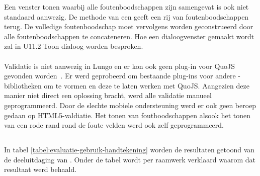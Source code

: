 Een venster tonen waarbij alle foutenboodschappen zijn samengevat is ook niet standaard aanwezig.
De  methode van een  geeft een rij van foutenboodschappen terug.
De volledige foutenboodschap moet vervolgens worden geconstrueerd door alle foutenboodschappen te concateneren.
Hoe een dialoogvenster gemaakt wordt zal in U11.2 Toon dialoog worden besproken.

\paragraph{\lungo}
Validatie is niet aanwezig in Lungo en er kon ook geen plug-in voor QuoJS gevonden worden~\cite{Ameye2013}.
Er werd geprobeerd om bestaande plug-ins voor andere \js{}-bibliotheken om te vormen en deze te laten werken met QuoJS.
Aangezien deze manier niet direct een oplossing bracht, werd alle validatie manueel geprogrammeerd.
Door de slechte mobiele ondersteuning werd er ook geen beroep gedaan op HTML5-valdiatie.
Het tonen van foutboodschappen alsook het tonen van een rode rand rond de foute velden werd ook zelf geprogrammeerd.


\subsection{}
\label{sec:evaluatie-gebruik-handtekening}

In tabel \ref{tabel:evaluatie-gebruik-handtekening} worden de resultaten getoond van de deeluitdaging van .
Onder de tabel wordt per raamwerk verklaard waarom dat resultaat werd behaald.

\begin{table}[H]
\centering
{}
\caption{Gebruik voor }
\label{tabel:evaluatie-gebruik-handtekening}
\end{table}

